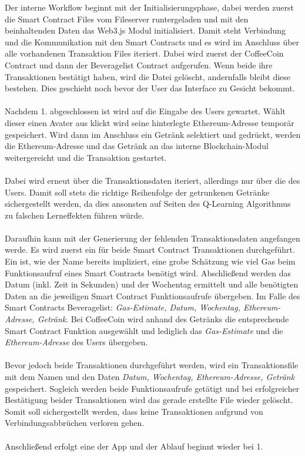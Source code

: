 Der interne Workflow beginnt mit der Initialisierungsphase, dabei werden zuerst die Smart Contract Files vom Fileserver runtergeladen und mit den beinhaltenden Daten das Web3.js Modul initialisiert. Damit steht Verbindung und die Kommunikation mit den Smart Contracts und es wird im Anschluss über alle vorhandenen Transaktion Files iteriert. Dabei wird zuerst der CoffeeCoin Contract und dann der Beveragelist Contract aufgerufen. Wenn beide ihre Transaktionen bestätigt haben, wird die Datei gelöscht, andernfalls bleibt diese bestehen. Dies geschieht noch bevor der User das Interface zu Gesicht bekommt.\\\\
Nachdem 1. abgeschlossen ist wird auf die Eingabe des Users gewartet. Wählt dieser einen Avater aus klickt  wird seine hinterlegte Ethereum-Adresse temporär gespeichert. Wird dann im Anschluss ein Getränk selektiert und  gedrückt, werden die Ethereum-Adresse und das Getränk an das interne Blockchain-Modul weitergereicht und die Transaktion gestartet. \\\\
Dabei wird erneut über die Transaktionsdaten iteriert, allerdings nur über die des Users. Damit soll stets die richtige Reihenfolge der getrunkenen Getränke sichergestellt werden, da dies ansonsten auf Seiten des Q-Learning Algorithmus zu falschen Lerneffekten führen würde.\\\\
Daraufhin kann mit der Generierung der fehlenden Transaktionsdaten angefangen werde. Es wird zuerst ein  für beide Smart Contract Transaktionen durchgeführt. Ein  ist, wie der Name bereits impliziert, eine grobe Schätzung wie viel Gas beim Funktionsaufruf eines Smart Contracts benötigt wird. Abschließend werden das Datum (inkl. Zeit in Sekunden) und der Wochentag ermittelt und alle benötigten Daten an die jeweiligen Smart Contract Funktionsaufrufe übergeben. Im Falle des Smart Contracts Beveragelist: \textit{Gas-Estimate, Datum, Wochentag, Ethereum-Adresse, Getränk}.
Bei CoffeeCoin wird anhand des Getränks die entsprechende Smart Contract Funktion ausgewählt und lediglich das \textit{Gas-Estimate} und die \textit{Ethereum-Adresse} des Users übergeben.\\\\
Bevor jedoch beide Transaktionen durchgeführt werden, wird ein Transaktionsfile mit dem Namen  und den Daten \textit{Datum, Wochentag, Ethereum-Adresse, Getränk} gespeichert. Sogleich werden beide Funktionsaufrufe getätigt und bei erfolgreicher Bestätigung beider Transaktionen wird das gerade erstellte File wieder gelöscht. Somit soll sichergestellt werden, dass keine Transaktionen aufgrund von Verbindungsabbrüchen verloren gehen. \\\\
Anschließend erfolgt eine  der App und der Ablauf beginnt wieder bei 1.